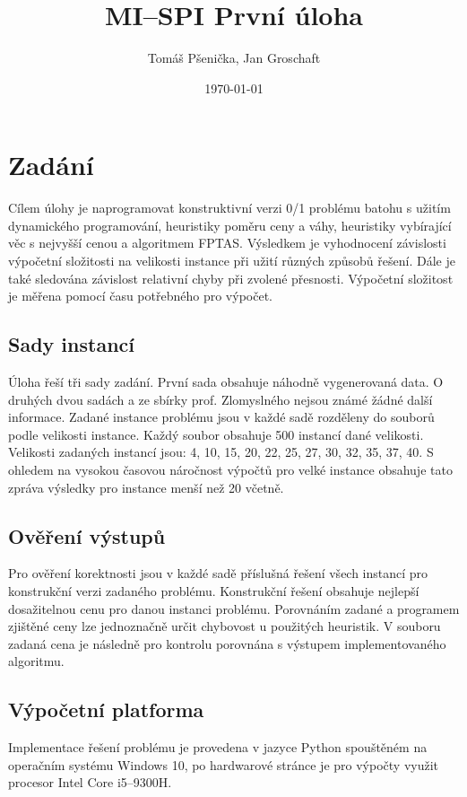\documentclass[12pt]{article}
\title{MI--SPI První úloha}
\author{Tomáš Pšenička, Jan Groschaft}
\date{\today}
\begin{document}
 
\begin{titlingpage}
	\maketitle
\end{titlingpage}
 	
	\newpage
 
	\tableofcontents

	\newpage

 	\section{Zadání}
 		Cílem úlohy je naprogramovat konstruktivní verzi 0/1 problému batohu s užitím dynamického programování, heuristiky poměru ceny a váhy, heuristiky vybírající věc s nejvyšší cenou a algoritmem FPTAS. Výsledkem je vyhodnocení závislosti výpočetní složitosti na velikosti instance při užití různých způsobů řešení. Dále je také sledována závislost relativní chyby při zvolené přesnosti. Výpočetní složitost je měřena pomocí času potřebného pro výpočet.
 	
 		\subsection{Sady instancí}
 			Úloha řeší tři sady zadání. První sada  obsahuje náhodně vygenerovaná data. O druhých dvou sadách  a  ze sbírky prof. Zlomyslného nejsou známé žádné další informace. Zadané instance problému jsou v každé sadě rozděleny do souborů podle velikosti instance. Každý soubor obsahuje 500 instancí dané velikosti. Velikosti zadaných instancí jsou: 4, 10, 15, 20, 22, 25, 27, 30, 32, 35, 37, 40. S ohledem na vysokou časovou náročnost výpočtů pro velké instance obsahuje tato zpráva výsledky pro instance menší než 20 včetně.
 		
 		\subsection{Ověření výstupů}
 			Pro ověření korektnosti jsou v každé sadě příslušná řešení všech instancí pro konstrukční verzi zadaného problému. Konstrukční řešení obsahuje nejlepší dosažitelnou cenu pro danou instanci problému. Porovnáním zadané a programem zjištěné ceny lze jednoznačně určit chybovost u použitých heuristik. V souboru zadaná cena je následně pro kontrolu porovnána s výstupem implementovaného algoritmu.
 		 
 		
   		\subsection{Výpočetní platforma}
   			Implementace řešení problému je provedena v jazyce Python spouštěném na operačním systému Windows 10, po hardwarové stránce je pro výpočty využit procesor Intel Core i5--9300H.
   		
\end{document}
